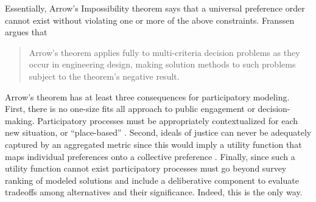 Essentially, Arrow's Impossibility theorem says that a universal preference
order cannot exist without violating one or more of the above constraints.
Franssen argues that \blockcquote[p. 42]{franssen_arrows_2005}{Arrow’s theorem
applies fully to multi-criteria decision problems as they occur in engineering
design, making solution methods to such problems subject to the theorem’s
negative result.} Arrow's theorem has at least three consequences for
participatory modeling. First, there is no one-size fits all approach to public
engagement or decision-making. Participatory processes must be appropriately
contextualized for each new situation, or ``place-based''
\cite{elmallah_frontlining_2022}. Second, ideals of justice can never be
adequately captured by an aggregated metric since this would imply a utility
function that maps individual preferences onto a collective preference
\cite{jafino_enabling_2021}. Finally, since such a utility function cannot exist
participatory processes must go beyond survey ranking of modeled solutions and
include a deliberative component to evaluate tradeoffs among alternatives and
their significance. Indeed, this is the only way.
